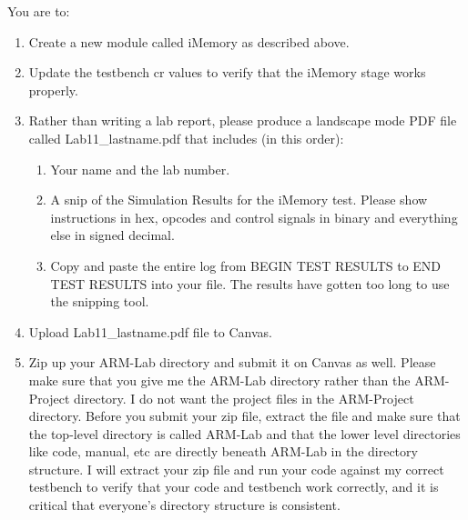 You are to:
\begin{enumerate}
\item Create a new module called iMemory as described above.
\item Update the testbench cr values to verify that the iMemory stage works properly. 
\item Rather than writing a lab report, please produce a landscape mode PDF file called Lab11\_lastname.pdf that includes (in this order):
\begin{enumerate}
	\item Your name and the lab number.
	\item A snip of the Simulation Results for the iMemory test.  Please show instructions in hex, opcodes and control signals in binary and everything else in signed decimal.  
	\item Copy and paste the entire log from BEGIN TEST RESULTS to END TEST RESULTS into your file.  The results have gotten too long to use the snipping tool.	
\end{enumerate}
\item Upload Lab11\_lastname.pdf file to Canvas.
\item Zip up your ARM-Lab directory and submit it on Canvas as well.  Please make sure that you give me the ARM-Lab directory rather than the ARM-Project directory.  I do not want the project files in the ARM-Project directory.  Before you submit your zip file, extract the file and make sure that the top-level directory is called ARM-Lab and that the lower level directories like code, manual, etc are directly beneath ARM-Lab in the directory structure.  I will extract your zip file and run your code against my correct testbench to verify that your code and testbench work correctly, and it is critical that everyone's directory structure is consistent.
\end{enumerate} 